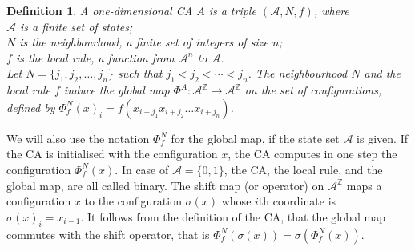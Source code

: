 \documentclass[a4paper]{article}
\newtheorem{deft}[prop]{Definition}
\begin{document}
\begin{deft}
\label{def:CA}
A one-dimensional CA $A$ is a triple $(\mathcal{A}, N, f)$, where \\
$\mathcal{A}$ is a finite set of states; \\
$N$ is the neighbourhood, a finite set of integers of size $n$; \\
$f$ is the local rule, a function from $\mathcal{A}^n$ to $\mathcal{A}$. \\
Let $N=\{j_1,j_2, \ldots,j_{n}\}$ such that $j_1 < j_2 < \cdots < j_{n}$.
The neighbourhood $N$ and the local rule $f$ induce the global map
$\Phi^A : \mathcal{A}^\mathbb{Z} \rightarrow \mathcal{A}^\mathbb{Z}$ on the set of configurations, defined by
$\Phi^N_f(x)_{i} = f(x_{i+j_1}x_{i+j_{2}}\ldots x_{i+j_{n}})$.
\end{deft}
We will also use the notation $\Phi^N_f$ for the global map, if the state set $\mathcal{A}$ is given.
If the CA is initialised with the configuration $x$, the CA computes in one step
the configuration $\Phi^N_f(x)$.
In case of $\mathcal{A} = \{0,1\}$, the CA, the local rule, and the global map, are all called binary.
The shift map (or operator) on $\mathcal{A}^\mathbb{Z}$ maps a configuration $x$ to the configuration $\sigma(x)$
whose $i$th coordinate is $\sigma(x)_i = x_{i+1}$.
It follows from the definition of the CA, that the global map commutes with the shift operator, that is
$\Phi^N_f(\sigma(x)) = \sigma(\Phi^N_f(x))$.
\end{document}
